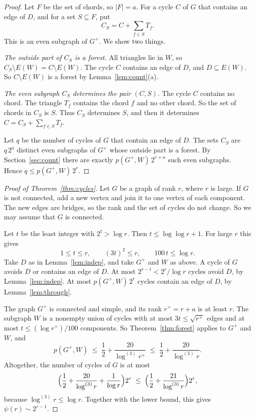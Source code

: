 \documentclass[11pt]{article}
\theoremstyle{definition}
\theoremstyle{remark}
\newcommand{\lgk}[1]{\log^{(#1)}}
\newcommand{\sm}{\setminus}
\begin{document}
\begin{proof}
Let $F$ be the set of chords, so $|F|=a$. For a cycle $C$ of $G$ that contains an edge of $D$, and
for a set $S\subseteq F$, put
\[
  C_S=C+\sum_{f\in S}T_f .
\]
This is an even subgraph of $G^{+}$. We show two things.

\emph{The outside part of $C_S$ is a forest.} All triangles lie in $W$, so
$C_S\sm E(W)=C\sm E(W)$. The cycle $C$ contains an edge of $D$, and $D\subseteq E(W)$. So
$C\sm E(W)$ is a forest by Lemma~\ref{lem:count}(a).

\emph{The even subgraph $C_S$ determines the pair $(C,S)$.} The cycle $C$ contains no chord. The
triangle $T_f$ contains the chord $f$ and no other chord. So the set of chords in $C_S$ is $S$. Thus
$C_S$ determines $S$, and then it determines $C=C_S+\sum_{f\in S}T_f$.

Let $q$ be the number of cycles of $G$ that contain an edge of $D$. The sets $C_S$ are $q\,2^{a}$
distinct even subgraphs of $G^{+}$ whose outside part is a forest. By Section~\ref{sec:count} there are exactly
$p(G^{+},W)\,2^{r+a}$ such even subgraphs. Hence $q\le p(G^{+},W)\,2^{r}$.
\end{proof}

\begin{proof}[Proof of Theorem~\ref{thm:cycles}]
Let $G$ be a graph of rank $r$, where $r$ is large. If $G$ is not connected, add a new vertex and
join it to one vertex of each component. The new edges are bridges, so the rank and the set of
cycles do not change. So we may assume that $G$ is connected.

Let $t$ be the least integer with $2^{t}>\log r$. Then $t\le\log\log r+1$. For large $r$ this gives
\[
  1\le t\le r,\qquad(3t)^{2}\le r,\qquad100\,t\le\log r .
\]
Take $D$ as in Lemma~\ref{lem:indep}, and take $G^{+}$ and $W$ as above. A cycle of $G$ avoids $D$
or contains an edge of $D$. At most $2^{r-t}<2^{r}/\log r$ cycles avoid $D$, by
Lemma~\ref{lem:indep}. At most $p(G^{+},W)\,2^{r}$ cycles contain an edge of $D$, by
Lemma~\ref{lem:through}.

The graph $G^{+}$ is connected and simple, and its rank $r^{+}=r+a$ is at least $r$. The subgraph
$W$ is a nonempty union of cycles with at most $3t\le\sqrt{r^{+}}$ edges and at most
$t\le(\log r^{+})/100$ components. So Theorem~\ref{thm:forest} applies to $G^{+}$ and $W$, and
\[
  p(G^{+},W)\;\le\;\frac12+\frac{20}{\lgk3r^{+}}\;\le\;\frac12+\frac{20}{\lgk3r}.
\]
Altogether, the number of cycles of $G$ is at most
\[
  \Bigl(\frac12+\frac{20}{\lgk3r}+\frac1{\log r}\Bigr)2^{r}
  \;\le\;\Bigl(\frac12+\frac{21}{\lgk3r}\Bigr)2^{r},
\]
because $\lgk3r\le\log r$. Together with the lower bound, this gives $\psi(r)\sim2^{r-1}$.
\end{proof}
\end{document}
